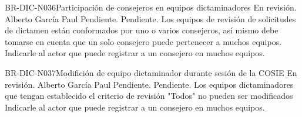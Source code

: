 \begin{BusinessRule}{BR-DIC-N036}{Participación de consejeros en equipos dictaminadores}
	{\bcDerivation} %
	{\btEnabler}     %
	{\blInfluencing}     %
	\BRItem[Estado] En revisión.
	 Alberto García Paul
	 Pendiente.
	 Pendiente.
	\BRItem[Descripción] Los equipos de revisión de solicitudes de dictamen están conformados por uno o varios consejeros, así mismo debe tomarse en cuenta que un solo consejero puede pertenecer a muchos equipos.
%		
	\BRItem[Motivación] Indicarle al actor que puede registrar a un consejero en muchos equipos.
\end{BusinessRule}

\begin{BusinessRule}{BR-DIC-N037}{Modifición de equipo dictaminador durante sesión de la COSIE}
	{\bcDerivation} %
	{\btEnabler}     %
	{\blInfluencing}     %
	\BRItem[Estado] En revisión.
	 Alberto García Paul
	 Pendiente.
	 Pendiente.
	\BRItem[Descripción] Los equipos dictaminadores que tengan establecido el criterio de revisión "Todos" no pueden ser modificados 
	\BRItem[Motivación] Indicarle al actor que puede registrar a un consejero en muchos equipos.
	
\end{BusinessRule}

